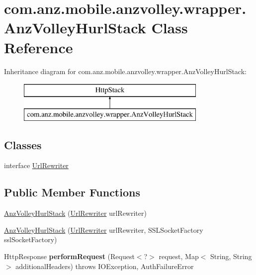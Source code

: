 \hypertarget{classcom_1_1anz_1_1mobile_1_1anzvolley_1_1wrapper_1_1_anz_volley_hurl_stack}{\section{com.\+anz.\+mobile.\+anzvolley.\+wrapper.\+Anz\+Volley\+Hurl\+Stack Class Reference}
\label{classcom_1_1anz_1_1mobile_1_1anzvolley_1_1wrapper_1_1_anz_volley_hurl_stack}
}
Inheritance diagram for com.\+anz.\+mobile.\+anzvolley.\+wrapper.\+Anz\+Volley\+Hurl\+Stack\+:\begin{figure}[H]
\begin{center}
\leavevmode
\includegraphics[height=2.000000cm]{classcom_1_1anz_1_1mobile_1_1anzvolley_1_1wrapper_1_1_anz_volley_hurl_stack}
\end{center}
\end{figure}
\subsection*{Classes}
\begin{DoxyCompactItemize}
\item 
interface \hyperlink{interfacecom_1_1anz_1_1mobile_1_1anzvolley_1_1wrapper_1_1_anz_volley_hurl_stack_1_1_url_rewriter}{Url\+Rewriter}
\end{DoxyCompactItemize}
\subsection*{Public Member Functions}
\begin{DoxyCompactItemize}
\item 
\hyperlink{classcom_1_1anz_1_1mobile_1_1anzvolley_1_1wrapper_1_1_anz_volley_hurl_stack_acaaa38e162e4ec2a85ae3dc066c89f2d}{Anz\+Volley\+Hurl\+Stack} (\hyperlink{interfacecom_1_1anz_1_1mobile_1_1anzvolley_1_1wrapper_1_1_anz_volley_hurl_stack_1_1_url_rewriter}{Url\+Rewriter} url\+Rewriter)
\item 
\hyperlink{classcom_1_1anz_1_1mobile_1_1anzvolley_1_1wrapper_1_1_anz_volley_hurl_stack_a69103647ef654887882d3be2b9f7912e}{Anz\+Volley\+Hurl\+Stack} (\hyperlink{interfacecom_1_1anz_1_1mobile_1_1anzvolley_1_1wrapper_1_1_anz_volley_hurl_stack_1_1_url_rewriter}{Url\+Rewriter} url\+Rewriter, S\+S\+L\+Socket\+Factory ssl\+Socket\+Factory)
\item 
\hypertarget{classcom_1_1anz_1_1mobile_1_1anzvolley_1_1wrapper_1_1_anz_volley_hurl_stack_a3b7970c5ebb857081da22fd4e9b985c5}{Http\+Response {\bfseries perform\+Request} (Request$<$?$>$ request, Map$<$ String, String $>$ additional\+Headers)  throws I\+O\+Exception, Auth\+Failure\+Error }\label{classcom_1_1anz_1_1mobile_1_1anzvolley_1_1wrapper_1_1_anz_volley_hurl_stack_a3b7970c5ebb857081da22fd4e9b985c5}

\end{DoxyCompactItemize}
